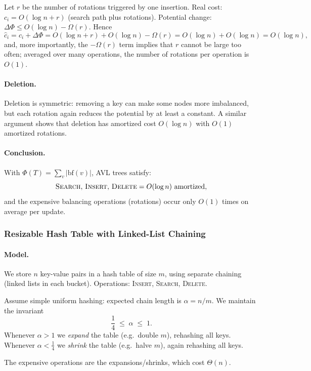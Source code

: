 \documentclass[9pt]{extarticle}
\begin{document}
Let $r$ be the number of rotations triggered by one insertion.  
Real cost: $c_i = O(\log n + r)$ (search path plus rotations).  
Potential change: $\Delta\Phi \le O(\log n) - \Omega(r)$.
Hence
\[
  \hat c_i = c_i + \Delta\Phi
           = O(\log n + r) + O(\log n) - \Omega(r)
           = O(\log n) + O(\log n)
           = O(\log n),
\]
and, more importantly, the $-\Omega(r)$ term implies that
$r$ cannot be large too often; averaged over many operations,
the number of rotations per operation is $O(1)$.

\paragraph{Deletion.}
Deletion is symmetric: removing a key can make some nodes more imbalanced,
but each rotation again reduces the potential by at least a constant.
A similar argument shows that deletion has amortized cost $O(\log n)$
with $O(1)$ amortized rotations.

\paragraph{Conclusion.}
With $\Phi(T) = \sum_v |\text{bf}(v)|$, AVL trees satisfy:
\[
  \textsc{Search},\, \textsc{Insert},\, \textsc{Delete}
  = O(\log n) \text{ amortized},
\]
and the expensive balancing operations (rotations) occur only $O(1)$ times
on average per update.

\subsubsection{Resizable Hash Table with Linked-List Chaining}

\paragraph{Model.}
We store $n$ key-value pairs in a hash table of size $m$, using separate chaining
(linked lists in each bucket).
Operations: \textsc{Insert}, \textsc{Search}, \textsc{Delete}.

Assume simple uniform hashing: expected chain length is $\alpha = n/m$.
We maintain the invariant
\[
  \frac{1}{4} \;\le\; \alpha \;\le\; 1.
\]
Whenever $\alpha > 1$ we \emph{expand} the table (e.g.\ double $m$),
rehashing all keys.  
Whenever $\alpha < \tfrac{1}{4}$ we \emph{shrink} the table (e.g.\ halve $m$),
again rehashing all keys.

The expensive operations are the expansions/shrinks, which cost $\Theta(n)$.
\end{document}

